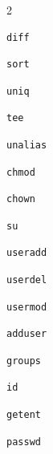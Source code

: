 \documentclass[10pt]{article}
\begin{document}
\begin{multicols*}{2}
\begin{lstlisting}
diff
\end{lstlisting}

\begin{lstlisting}
sort
\end{lstlisting}

\begin{lstlisting}
uniq
\end{lstlisting}

\begin{lstlisting}
tee
\end{lstlisting}

\begin{lstlisting}
unalias
\end{lstlisting}

\begin{lstlisting}
chmod
\end{lstlisting}

\begin{lstlisting}
chown
\end{lstlisting}

\begin{lstlisting}
su
\end{lstlisting}

\begin{lstlisting}
useradd
\end{lstlisting}

\begin{lstlisting}
userdel
\end{lstlisting}

\begin{lstlisting}
usermod
\end{lstlisting}

\begin{lstlisting}
adduser
\end{lstlisting}

\begin{lstlisting}
groups
\end{lstlisting}

\begin{lstlisting}
id
\end{lstlisting}

\begin{lstlisting}
getent
\end{lstlisting}

\begin{lstlisting}
passwd
\end{lstlisting}


\end{multicols*}
\end{document}
